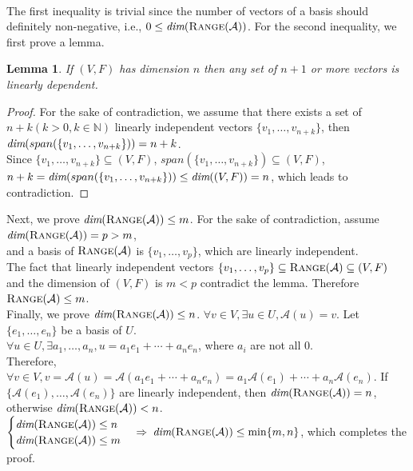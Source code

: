 \documentclass[fleqn, 10.5pt, a4paper]{article}
\newcommand\N{{\mathbb N}}
\newcommand\A{\mathcal{A}}
\newtheorem{lemma}{Lemma}
\newtheorem{proof}{Proof}
\theoremstyle{definition}
\numberwithin{equation}{section}
\renewcommand{\dim}{{\mbox{\em dim}}}
\newcommand{\range}{{\mbox{\sc Range}}}
\begin{document}
 \\
The first inequality is trivial since the number of vectors of a basis should definitely non-negative, i.e., $0 \leq \dim(\range(\mathcal{A}))$. For the second inequality, we first prove a lemma.
\begin{lemma}
	If $(V,F)$ has dimension $n$ then any set of $n+1$ or more vectors is linearly dependent.
\end{lemma}
\begin{proof}
	For the sake of contradiction, we assume that there exists a set of $n+k\left(k>0, k \in \N\right)$ linearly independent vectors $\{v_1, \dots,v_{n+k}\}$, then $\dim(span(\{v_1, \dots,v_{n+k}\}))=n+k$. \\
	Since $\{v_1, \dots,v_{n+k}\} \subseteq (V,F)$, $span(\{v_1, \dots,v_{n+k}\}) \subseteq (V,F)$, \\
	$n+k = \dim(span(\{v_1, \dots,v_{n+k}\})) \leq \dim((V,F)) = n$, which leads to contradiction.
\end{proof}
Next, we prove $\dim(\range(\A)) \leq m$. For the sake of contradiction, assume $\dim(\range(\A)) = p > m$, \\
and a basis of $\range(\A)$ is $\{v_1,\dots,v_p\}$, which are linearly independent. \\
The fact that linearly independent vectors $\{v_1,\dots,v_p\} \subseteq \range(\A) \subseteq (V,F)$ and the dimension of $(V,F)$ is $m<p$ contradict the lemma. Therefore $\range(\A) \leq m$. \\
Finally, we prove $\dim(\range(\A)) \leq n$. $\forall v \in V, \exists u \in U, \A(u)=v$. Let $\{e_1,\dots,e_n\}$ be a basis of $U$. \\
$\forall u \in U, \exists a_1, \dots, a_n, u = a_1 e_1 + \cdots + a_n e_n$, where $a_i$ are not all $0$. \\
Therefore, $\forall v \in V, v = \A (u) = \A \left(a_1 e_1 + \cdots + a_n e_n\right) = a_1 \A(e_1) + \cdots + a_n \A(e_n)$. If $\{\A(e_1), \dots, \A(e_n)\}$ are linearly independent, then $\dim(\range(\A)) = n$, otherwise $\dim(\range(\A)) < n$. \\
$\begin{cases}
\dim(\range(\A)) \leq n \\
\dim(\range(\A)) \leq m
\end{cases} \Rightarrow$ $\dim(\range(\A)) \leq \min \{m,n\}$, which completes the proof. \\
\ \\
\end{document}
